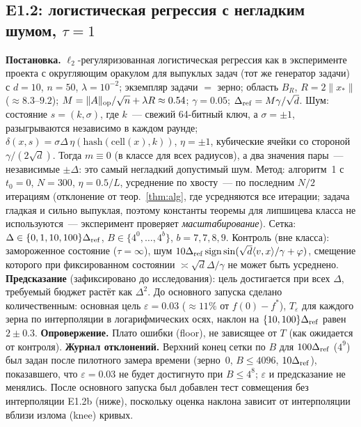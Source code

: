 \documentclass[11pt,a4paper]{article}
\numberwithin{equation}{section}
\theoremstyle{definition}
\theoremstyle{remark}
\newcommand{\norm}[1]{\lVert #1\rVert}\newcommand{\abs}[1]{\lvert #1\rvert}\newcommand{\ip}[2]{\langle #1,#2\rangle}
\begin{document}
\subsection{E1.2: логистическая регрессия с негладким шумом, $\tau=1$}
\textbf{Постановка.} $\ell_2$-регуляризованная логистическая регрессия как в эксперименте проекта с округляющим оракулом для выпуклых задач (тот же генератор задачи) с $d=10$, $n=50$, $\lambda=10^{-2}$; экземпляр задачи $=$ зерно; область $B_R$, $R=2\norm{x_*}$ ($\approx8.3$--$9.2$); $M=\norm A_{\rm op}/\sqrt n+\lambda R\approx0.54$; $\gamma=0.05$; $\Delta_{\rm ref}=M\gamma/\sqrt d$.
Шум: состояние $s=(k,\sigma)$, где $k$~--- свежий 64-битный ключ, а $\sigma=\pm1$, разыгрываются независимо в каждом раунде; $\delta(x,s)=\sigma\Delta\,\eta(\mathrm{hash}(\mathrm{cell}(x),k))$, $\eta=\pm1$, кубические ячейки со стороной $\gamma/(2\sqrt d)$. Тогда $m\equiv0$ (в классе для всех радиусов), а два значения пары~--- независимые $\pm\Delta$: это самый негладкий допустимый шум.
Метод: алгоритм~1 с $t_0=0$, $N=300$, $\eta=0.5/L$, усреднение по хвосту~--- по последним $N/2$ итерациям (отклонение от теор.~\ref{thm:alg}, где усредняются все итерации; задача гладкая и сильно выпуклая, поэтому константы теоремы для липшицева класса не используются~--- эксперимент проверяет \emph{масштабирование}). Сетка: $\Delta\in\{0,1,10,100\}\Delta_{\rm ref}$, $B\in\{4^0,\dots,4^{b}\}$, $b=7,7,8,9$.
Контроль (вне класса): замороженное состояние ($\tau=\infty$), шум $10\Delta_{\rm ref}\,\mathrm{sign}\sin(\sqrt d\ip vx/\gamma+\varphi)$, смещение которого при фиксированном состоянии $\asymp\sqrt d\Delta/\gamma$ не может быть усреднено.
\textbf{Предсказание} (зафиксировано до исследования): цель достигается при всех $\Delta$, требуемый бюджет растёт как $\Delta^2$. До основного запуска сделано количественным: основная цель $\varepsilon=0.03$ ($\approx11\%$ от $f(0)-f^*$), $T_\varepsilon$ для каждого зерна по интерполяции в логарифмических осях, наклон на $\{10,100\}\Delta_{\rm ref}$ равен $2\pm0.3$.
\textbf{Опровержение.} Плато ошибки (floor), не зависящее от $T$ (как ожидается от контроля).
\textbf{Журнал отклонений.} Верхний конец сетки по $B$ для $100\Delta_{\rm ref}$ ($4^9$) был задан после пилотного замера времени (зерно~0, $B\le4096$, $10\Delta_{\rm ref}$), показавшего, что $\varepsilon=0.03$ не будет достигнуто при $B\le4^8$; $\varepsilon$ и предсказание не менялись. После основного запуска был добавлен тест совмещения без интерполяции E1.2b (ниже), поскольку оценка наклона зависит от интерполяции вблизи излома (knee) кривых.
\end{document}
